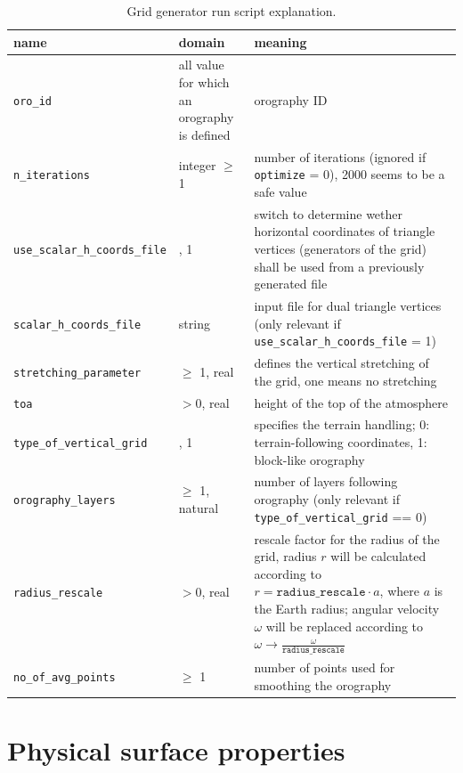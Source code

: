 \documentclass[10pt]{report}
\begin{document}
\renewcommand{\arraystretch}{1.2}
\begin{table}
\centering
\begin{tabular}{|>{\centering}p{5.0 cm}|>{\centering}p{3 cm}|>{\centering}p{7 cm}|}
\hline \textbf{name} & \textbf{domain} & \textbf{meaning} \tabularnewline
\hline\hline \texttt{\texttt{oro\_id}} & all value for which an orography is defined & orography ID \tabularnewline
\hline\hline \texttt{n\_iterations} & integer $\geq$ 1 & number of iterations (ignored if \texttt{optimize} = 0), 2000 seems to be a safe value \tabularnewline
\hline\hline \texttt{use\_scalar\_h\_coords\_file} & 0, 1 & switch to determine wether horizontal coordinates of triangle vertices (generators of the grid) shall be used from a previously generated file \tabularnewline
\hline\hline \texttt{scalar\_h\_coords\_file} & string & input file for dual triangle vertices (only relevant if \texttt{use\_scalar\_h\_coords\_file} = 1) \tabularnewline
\hline\hline \texttt{stretching\_parameter} & $\geq$ 1, real & defines the vertical stretching of the grid, one means no stretching \tabularnewline
\hline\hline \texttt{toa} & $> 0$, real & height of the top of the atmosphere \tabularnewline
\hline\hline \texttt{type\_of\_vertical\_grid} & 0, 1 & specifies the terrain handling; 0: terrain-following coordinates, 1: block-like orography \tabularnewline
\hline\hline \texttt{orography\_layers} & $\geq$ 1, natural & number of layers following orography (only relevant if \texttt{type\_of\_vertical\_grid} == 0) \tabularnewline
\hline\hline \texttt{radius\_rescale} & $> 0$, real & rescale factor for the radius of the grid, radius $r$ will be calculated according to $r = \texttt{radius\_rescale}\cdot a$, where $a$ is the Earth radius; angular velocity $\omega$ will be replaced according to $\omega \to \frac{\omega}{\texttt{radius\_rescale}}$ \tabularnewline
\hline\hline \texttt{no\_of\_avg\_points} & $\geq$ 1 & number of points used for smoothing the orography \tabularnewline
\hline
\end{tabular}
\caption{Grid generator run script explanation.}
\label{tab:grid_generator_run_file_explanation}
\end{table}
\renewcommand{\arraystretch}{1}

\section{Physical surface properties}
\label{sec:physical_surface_properties}
\end{document}
